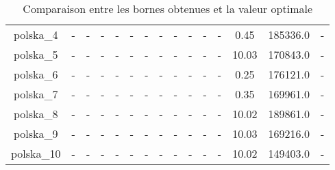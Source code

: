 \documentclass[main.tex]{subfiles}
\begin{document}
\begin{landscape}
\begin{table}[h]
\begin{tabular}{c|cc|ccc|ccc|ccc|ccc}
	polska\_4 &- &- &- &- &- &- &- &- &- &- &- &0.45 &185336.0 &-\\
	polska\_5 &- &- &- &- &- &- &- &- &- &- &- &10.03 &170843.0 &-\\
	polska\_6 &- &- &- &- &- &- &- &- &- &- &- &0.25 &176121.0 &-\\
	polska\_7 &- &- &- &- &- &- &- &- &- &- &- &0.35 &169961.0 &-\\
	polska\_8 &- &- &- &- &- &- &- &- &- &- &- &10.02 &189861.0 &-\\
	polska\_9 &- &- &- &- &- &- &- &- &- &- &- &10.03 &169216.0 &-\\
	polska\_10 &- &- &- &- &- &- &- &- &- &- &- &10.02 &149403.0 &-\\
\end{tabular}\caption{Comparaison entre les bornes obtenues et la valeur optimale}
\end{table}
\end{landscape}
\end{document}

